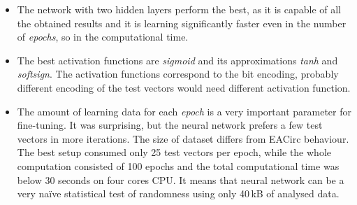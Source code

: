 \documentclass[
  print, %
  Table,   %
  nolof,     %
  nolot,     %
  11pt, %
  oneside  %
]{fithesis3}
\begin{document}
\begin{itemize}
    \item The network with two hidden layers perform the best, as it is capable of all the obtained results and it is learning significantly faster even in the number of \textit{epochs}, so in the computational time.
    \item The best activation functions are \textit{sigmoid} and its approximations \textit{tanh} and \textit{softsign}. The activation functions correspond to the bit encoding, probably different encoding of the test vectors would need different activation function.
    \item The amount of learning data for each \textit{epoch} is a very important parameter for fine-tuning. It was surprising, but the neural network prefers a few test vectors in more iterations. The size of dataset differs from EACirc behaviour. The best setup consumed only 25 test vectors per epoch, while the whole computation consisted of 100 epochs and the total computational time was below 30 seconds on four cores CPU. It means that neural network can be a very naïve statistical test of randomness using only 40\,kB of analysed data.
\end{itemize}
\end{document}
